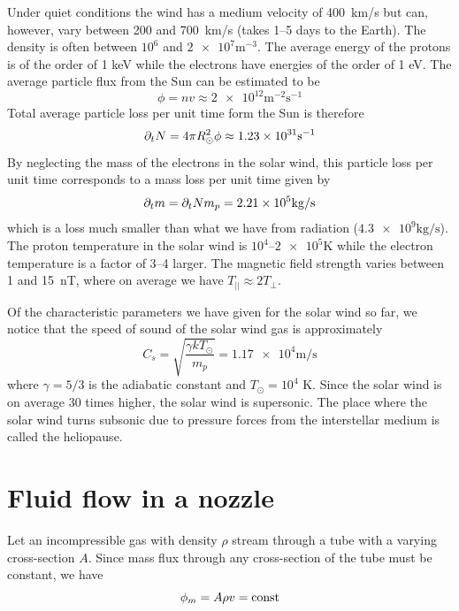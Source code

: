 Under quiet conditions the wind has a medium velocity of \SI{400}{\kilo\metre/\second} but can, however, vary between 200 and \SI{700}{\kilo\metre/\second} (takes 1--5 days to the Earth). The density is often between \(10^6\) and \(\num{2e7}\si{\metre^{-3}}\). The average energy of the protons is of the order of 1 keV while the electrons have energies of the order of 1 eV. The average particle flux from the Sun can be estimated to be
\begin{equation*}
    \phi=nv\approx\num{2e12}\si{\metre^{-2}\second^{-1}}
\end{equation*}
Total average particle loss per unit time form the Sun is therefore
\begin{equation*}
    \p{t}{N}=4\pi R_\odot^2\phi\approx\num{1.23e31}\si{\second^{-1}}
\end{equation*}
By neglecting the mass of the electrons in the solar wind, this particle loss per unit time corresponds to a mass loss per unit time given by
\begin{equation*}
    \p{t}{m}=\p{t}{N}m_p=\num{2.21e5}\si{\kilo\gram/\second}
\end{equation*}
which is a loss much smaller than what we have from radiation (\(\num{4.3e9}\si{\kilo\gram/\second}\)). The proton temperature in the solar wind is \(10^4\)--\(\num{2e5}\si{\kelvin}\) while the electron temperature is a factor of 3--4 larger. The magnetic field strength varies between 1 and \SI{15}{\nano\tesla}, where on average we have \(T_{||}\approx 2T_\perp \).

Of the characteristic parameters we have given for the solar wind so far, we notice that the speed of sound of the solar wind gas is approximately
\begin{equation*}
    C_s=\sqrt{\frac{\gamma kT_\odot}{m_p}}=\num{1.17e4}\si{\metre/\second}
\end{equation*}
where \(\gamma=5/3\) is the adiabatic constant and \(T_\odot=10^4\) K. Since the solar wind is on average 30 times higher, the solar wind is supersonic. The place where the solar wind turns subsonic due to pressure forces from the interstellar medium is called the heliopause.

\section{Fluid flow in a nozzle}
Let an incompressible gas with density \(\rho \) stream through a tube with a varying cross-section \(A\). Since mass flux through any cross-section of the tube must be constant, we have
\begin{equation*}
    \phi_m=A\rho v=\tn{const}
\end{equation*}

